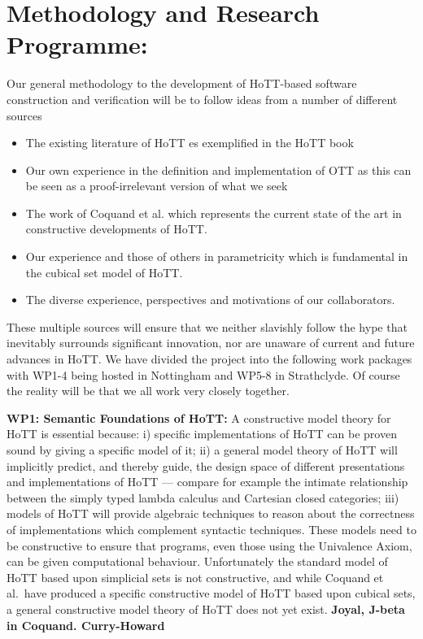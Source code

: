 \documentclass[a4paper,11pt]{article}
\begin{document}
\section{Methodology and Research Programme:}
Our general methodology to the development of HoTT-based software
construction and verification will be to follow ideas from a number of
different sources
\begin{itemize}
\item The existing literature of HoTT es exemplified in the HoTT book
\item Our own experience in the definition and implementation of OTT as
  this can be seen as a proof-irrelevant version of what we seek
\item The work of Coquand et al. which represents the current state of
  the art in constructive developments of HoTT.
\item Our experience and those of others in parametricity which is
  fundamental in the cubical set model of HoTT.
\item The diverse experience, perspectives and motivations of our collaborators.
\end{itemize}
These multiple sources will ensure that we neither slavishly follow
the hype that inevitably surrounds significant innovation, nor are
unaware of current and future advances in HoTT. We have divided the
project into the following work packages with WP1-4 being hosted in
Nottingham and WP5-8 in Strathclyde. Of course the reality will be
that we all work very closely together.
 
{\bf WP1: Semantic Foundations of HoTT:} 
A constructive model theory for HoTT is essential because: i)
specific implementations of HoTT can be proven sound by giving a specific
model of it; ii) 
a general model theory of HoTT will implicitly predict, and thereby
guide, the design space of different presentations and implementations
of HoTT --- compare for example the intimate relationship between the
simply typed lambda calculus and Cartesian closed categories; iii)
models of HoTT will provide algebraic techniques to reason about the
correctness of implementations which complement syntactic
techniques. These models need to be constructive to ensure that
programs, even those using the Univalence Axiom, can be given
computational behaviour. Unfortunately the standard model of HoTT
based upon simplicial sets is not constructive, and while Coquand et
al.\ have produced a specific constructive model of HoTT based upon
cubical sets, a general constructive model theory of HoTT does not yet
exist. {\bf Joyal, J-beta in Coquand. Curry-Howard}
\end{document}
